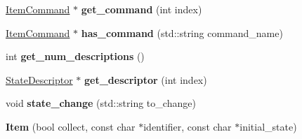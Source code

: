 \begin{DoxyCompactItemize}
\item 
\hypertarget{class_item_ab62952c89ce34100e5445478be3bcc1d}{
\hyperlink{class_item_command}{ItemCommand} $\ast$ {\bfseries get\_\-command} (int index)}
\label{class_item_ab62952c89ce34100e5445478be3bcc1d}

\item 
\hypertarget{class_item_aea84f53a54374dd4e9f2a056328bd218}{
\hyperlink{class_item_command}{ItemCommand} $\ast$ {\bfseries has\_\-command} (std::string command\_\-name)}
\label{class_item_aea84f53a54374dd4e9f2a056328bd218}

\item 
\hypertarget{class_item_a41e3300333fa679000fa94f6d5073268}{
int {\bfseries get\_\-num\_\-descriptions} ()}
\label{class_item_a41e3300333fa679000fa94f6d5073268}

\item 
\hypertarget{class_item_ac44dc32fbec845c69919c0e0cb7b24f9}{
\hyperlink{class_state_descriptor}{StateDescriptor} $\ast$ {\bfseries get\_\-descriptor} (int index)}
\label{class_item_ac44dc32fbec845c69919c0e0cb7b24f9}

\item 
\hypertarget{class_item_a3ec1f16ad405a8ddf9ae82a48de551ff}{
void {\bfseries state\_\-change} (std::string to\_\-change)}
\label{class_item_a3ec1f16ad405a8ddf9ae82a48de551ff}

\item 
\hypertarget{class_item_a5fc8374c5132b696c81da743ab8691b7}{
{\bfseries Item} (bool collect, const char $\ast$identifier, const char $\ast$initial\_\-state)}
\label{class_item_a5fc8374c5132b696c81da743ab8691b7}

\end{DoxyCompactItemize}
